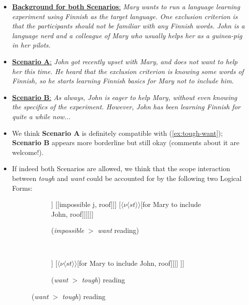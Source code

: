 \documentclass[11pt]{article}
\begin{document}
		\begin{itemize}
			\item \underline{\textbf{Background for both Scenarios}:} \textit{Mary wants to run a language learning experiment using Finnish as the target language. One exclusion criterion is that the participants should not be familiar with any Finnish words. John is a language nerd and a colleague of Mary who usually helps her as a guinea-pig in her pilots.}
			\item \underline{\textbf{Scenario A}:} \textit{John got recently upset with Mary, and does not want to help her this time. He heard that the exclusion criterion is knowing some words of Finnish, so he starts learning Finnish basics for Mary not to include him.}
			\item \underline{\textbf{Scenario B}:} \textit{As always, John is eager to help Mary, without even knowing the specifics of the experiment. However, John has been learning Finnish for quite a while now...}
		\end{itemize}

	\begin{itemize}
		\item We think \textbf{Scenario A} is definitely compatible with (\ref{ex:tough-want}); \textbf{Scenario B} appears more borderline but still okay (comments about it are welcome!).
		\item If indeed both Scenarios are allowed, we think that the scope interaction between \textit{tough} and \textit{want} could be accounted for by the following two Logical Forms:
		\begin{figure}[H]
			\centering
			\begin{subfigure}{.45\linewidth}
				\centering
				\begin{forest}
					[{$\langle st \rangle$}[{$\exists p_{\langle s t\rangle}$}][{$\langle \langle st \rangle \langle st \rangle \rangle$}[{$\lambda p_{\langle s t \rangle}$}] [{$\langle s t \rangle$}[{$\exists v_{\nu}$}] [{$\langle \nu \langle s t\rangle\rangle$}[{$\langle \nu \langle s t\rangle\rangle$}[{$e$}[{for John to want p}, roof]] [[{impossible j}, roof]]] [{$\langle \nu \langle s t\rangle\rangle$}[{for Mary to include John}, roof]]]]]]
				\end{forest}\caption{(\textit{impossible} $>$ \textit{want} reading)}
			\end{subfigure}\\
			\begin{subfigure}{.45\linewidth}
				\centering
				\begin{forest}
					[{$\langle s t \rangle$}[John] [{$\langle e \langle s t \rangle\rangle$}[wants] [{$\langle s t \rangle$}[{$\exists v_\nu$}][{$\langle \nu \langle s t \rangle \rangle$}[{$\langle \nu \langle s t \rangle \rangle$}[{John tough j}, roof]] [{$\langle \nu \langle s t \rangle \rangle$}[{for Mary to include John}, roof]]]] ]]
				\end{forest}\caption{(\textit{want} $>$ \textit{tough}) reading}
			\end{subfigure}
		
		\end{figure}
	\end{itemize}
\end{document}
